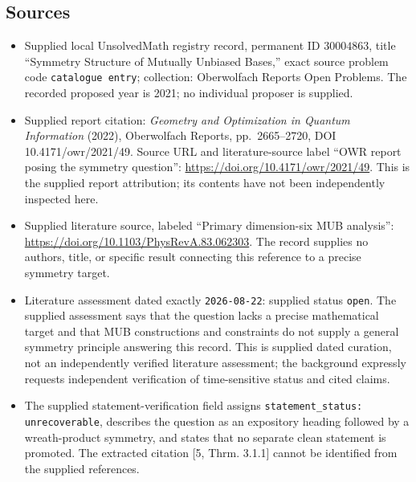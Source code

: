 \documentclass[11pt]{article}
\begin{document}
\subsection{Sources}
\begin{itemize}
\item Supplied local UnsolvedMath registry record, permanent ID \(30004863\), title ``Symmetry Structure of Mutually Unbiased Bases,'' exact source problem code \texttt{catalogue entry}; collection: Oberwolfach Reports Open Problems. The recorded proposed year is 2021; no individual proposer is supplied.
\item Supplied report citation: \emph{Geometry and Optimization in Quantum Information} (2022), Oberwolfach Reports, pp.\ 2665--2720, DOI 10.4171/owr/2021/49. Source URL and literature-source label ``OWR report posing the symmetry question'': \url{https://doi.org/10.4171/owr/2021/49}. This is the supplied report attribution; its contents have not been independently inspected here.
\item Supplied literature source, labeled ``Primary dimension-six MUB analysis'': \url{https://doi.org/10.1103/PhysRevA.83.062303}. The record supplies no authors, title, or specific result connecting this reference to a precise symmetry target.
\item Literature assessment dated exactly \texttt{2026-08-22}: supplied status \texttt{open}. The supplied assessment says that the question lacks a precise mathematical target and that MUB constructions and constraints do not supply a general symmetry principle answering this record. This is supplied dated curation, not an independently verified literature assessment; the background expressly requests independent verification of time-sensitive status and cited claims.
\item The supplied statement-verification field assigns \texttt{statement\_status: unrecoverable}, describes the question as an expository heading followed by a wreath-product symmetry, and states that no separate clean statement is promoted. The extracted citation [5, Thrm. 3.1.1] cannot be identified from the supplied references.
\end{itemize}
\end{document}
